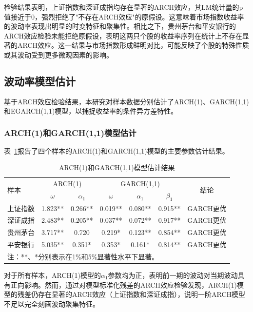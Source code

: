 \documentclass[12pt, a4paper]{article}
\begin{document}
检验结果表明，上证指数和深证成指均存在显著的ARCH效应，其LM统计量的p值接近于0，强烈拒绝了"不存在ARCH效应"的原假设。这意味着市场指数收益率的波动率表现出明显的时变特征和聚集性。相比之下，贵州茅台和平安银行的ARCH效应检验未能拒绝原假设，表明这两只个股的收益率序列在统计上不存在显著的ARCH效应。这一结果与市场指数形成鲜明对比，可能反映了个股的特殊性质或其波动受到更多微观因素的影响。

\subsection{波动率模型估计}

基于ARCH效应检验结果，本研究对样本数据分别估计了ARCH(1)、GARCH(1,1)和EGARCH(1,1)模型，以捕捉收益率的条件异方差特性。

\subsubsection{ARCH(1)和GARCH(1,1)模型估计}

表~\ref{tab:arch_garch_estimation}报告了四个样本的ARCH(1)和GARCH(1,1)模型的主要参数估计结果。

\begin{table}[htbp]
\centering
\caption{ARCH(1)和GARCH(1,1)模型估计结果}
\label{tab:arch_garch_estimation}
\begin{tabular}{lcccccc}
\toprule
\multirow{2}{*}{样本} & \multicolumn{2}{c}{ARCH(1)} & \multicolumn{3}{c}{GARCH(1,1)} & \multirow{2}{*}{结论} \\
\cmidrule(lr){2-3} \cmidrule(lr){4-6}
 & $\omega$ & $\alpha_1$ & $\omega$ & $\alpha_1$ & $\beta_1$ & \\
\midrule
上证指数 & 1.823** & 0.266** & 0.019** & 0.080** & 0.915** & GARCH更优 \\
深证成指 & 2.483** & 0.205** & 0.037** & 0.072** & 0.917** & GARCH更优 \\
贵州茅台 & 3.717** & 0.720 & 0.219* & 0.123** & 0.854** & GARCH更优 \\
平安银行 & 5.035** & 0.351* & 0.353* & 0.161* & 0.814** & GARCH更优 \\
\bottomrule
\multicolumn{7}{l}{\footnotesize{注：**、*分别表示在1\%和5\%显著性水平下显著。}} \\
\end{tabular}
\end{table}

对于所有样本，ARCH(1)模型的$\alpha_1$参数均为正，表明前一期的波动对当期波动具有正向影响。然而，通过对模型标准化残差的ARCH效应检验发现，ARCH(1)模型的残差仍存在显著的ARCH效应（上证指数和深证成指），说明一阶ARCH模型不足以完全刻画波动聚集特征。
\end{document}
